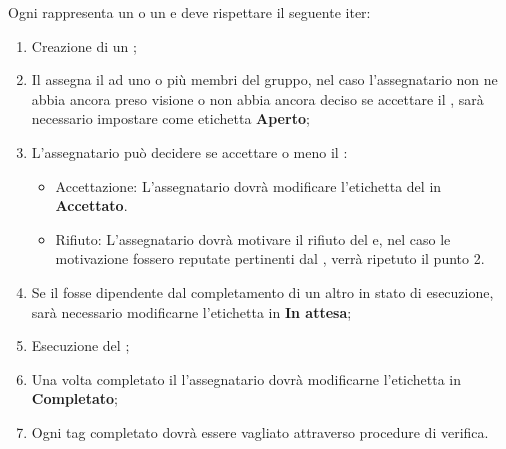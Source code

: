 \documentclass[12pt,a4paper]{article}
\begin{document}
Ogni \textit{} rappresenta un  o un \textit{} e deve rispettare il seguente iter:

\begin{enumerate}
  \item Creazione di un \textit{};
  \item Il \PM{} assegna il \textit{} ad uno o più membri del gruppo, nel caso l'assegnatario non ne abbia ancora preso visione o non abbia ancora deciso se accettare il \textit{}, sarà necessario impostare come etichetta \textbf{Aperto};  
    \item L'assegnatario può decidere se accettare o meno il \textit{}:
    	\begin{itemize}
    	\item Accettazione: L'assegnatario dovrà modificare l'etichetta del \textit{} in \textbf{Accettato}.
    	\item Rifiuto: L'assegnatario dovrà motivare il rifiuto del \textit{} e, nel caso le motivazione fossero reputate pertinenti dal \PM{}, verrà ripetuto il punto 2. 
    	\end{itemize}
	\item Se il \textit{} fosse dipendente dal completamento di un altro \textit{} in stato di esecuzione, sarà necessario modificarne l'etichetta in \textbf{In attesa};
	\item Esecuzione del \textit{};
	\item Una volta completato il \textit{} l'assegnatario dovrà modificarne l'etichetta in \textbf{Completato};
	\item Ogni tag completato dovrà essere vagliato attraverso procedure di verifica. 
\end{enumerate}
\end{document}
